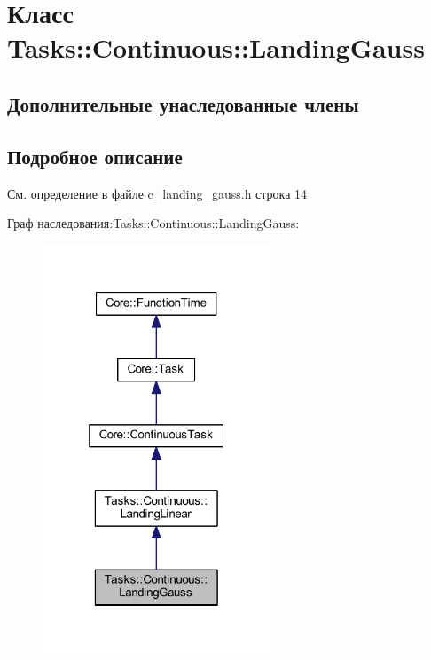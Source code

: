 \hypertarget{class_tasks_1_1_continuous_1_1_landing_gauss}{}\section{Класс Tasks\+:\+:Continuous\+:\+:Landing\+Gauss}
\label{class_tasks_1_1_continuous_1_1_landing_gauss}
\subsection*{Дополнительные унаследованные члены}


\subsection{Подробное описание}


См. определение в файле c\+\_\+landing\+\_\+gauss.\+h строка 14



Граф наследования\+:Tasks\+:\+:Continuous\+:\+:Landing\+Gauss\+:\nopagebreak
\begin{figure}[H]
\begin{center}
\leavevmode
\includegraphics[width=193pt]{class_tasks_1_1_continuous_1_1_landing_gauss__inherit__graph}
\end{center}
\end{figure}


